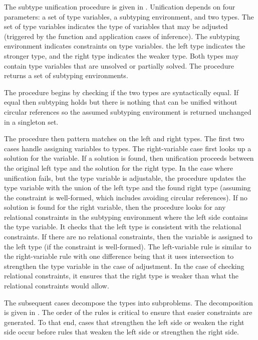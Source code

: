 \documentclass[acmsmall]{acmart}
\theoremstyle{definition}
\begin{document}
The subtype unification procedure is given in .
Unification depends on four parameters: a set of type variables, a subtyping environment, and two types.
The set of type variables indicates the type of variables that may be adjusted 
(triggered by the function and application cases of inference). 
The subtyping environment indicates constraints on type variables.
the left type indicates the stronger type, and the right type indicates the weaker type.
Both types may contain type variables that are unsolved or partially solved.
The procedure returns a set of subtyping environments.

The procedure begins by checking if the two types are syntactically equal.
If equal then subtyping holds but there is nothing that can be unified 
without circular references so the assumed subtyping environment is returned 
unchanged in a singleton set. 

The procedure then pattern matches on the left and right types. 
The first two cases handle assigning variables to types.
The right-variable case first looks up a solution  
for the variable. If a solution is found, then unification proceeds
between the original left type and the solution for the right type.
In the case where unification fails, but the type variable is adjustable,
the procedure updates the type variable with the union of the left type
and the found right type (assuming the constraint is well-formed, 
which includes avoiding circular references). 
If no solution is found for the right variable, then 
the procedure looks for any relational constraints in the subtyping environment
where the left side contains the type variable.
It checks that the left type is consistent with the relational constraints. 
If there are no relational constraints, then the variable is assigned
to the left type (if the constraint is well-formed).
The left-variable rule is similar to the right-variable rule with
one difference being that it uses intersection to strengthen the type variable 
in the case of adjustment. In the case of checking relational constraints, it
ensures that the right type is weaker than what the relational constraints would allow. 

The subsequent cases decompose the types into subproblems. 
The decomposition is given in . 
The order of the rules 
is critical to ensure that easier constraints are generated. To that end, cases that
strengthen the left side or weaken the right side occur before rules that
weaken the left side or strengthen the right side.
\end{document}
